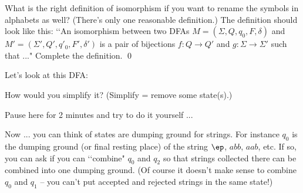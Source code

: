 \newpage
\begin{ex}
  What is the right definition of isomorphism
  if you want to rename the symbols in alphabets as well?
  (There's only one reasonable definition.)
  The definition should look like this:
  \lq\lq An isomorphism between two DFAs
  $M = (\Sigma, Q, q_0, F, \delta)$
  and
  $M' = (\Sigma', Q', q'_0, F', \delta')$
  is a pair of bijections $f: Q \rightarrow Q'$ and
  $g: \Sigma \rightarrow \Sigma'$ such that ..."
  Complete the definition.
  \qed
\end{ex}


\newpage

Let's look at this DFA:

\begin{comment}
\begin{python}
from latextool_basic import *
print(automata(layout="""
A  B

C  D
""",
edges="A,$a$,B|A,$b$,C|B,$a$,D|B,$b$,C|C,$b$,A|C,$a$,D|D,$a$,B|D,$b$,A",
A='initial|label=$q_0$',
B='accept|label=$q_1$',
C='label=$q_2$',
D='accept|label=$q_3$', xscale=1.3,
))
\end{python}
\end{comment}
\begin{center}
\end{center}

How would you simplify it? (Simplify = remove some state(s).)

Pause here for 2 minutes and try to do it yourself ...

Now ... you can think of states are dumping ground for
strings.
For instance $q_0$ is the dumping ground (or final resting place)
of the string $\ep$, $abb$, $aab$, etc.
If so, you can ask if you can \lq\lq combine" $q_0$ and $q_2$
so that strings collected there can be combined into one
dumping ground.
(Of course it doesn't make sense to combine $q_0$ and $q_1$ -- you can't put accepted and rejected strings in the same state!)

